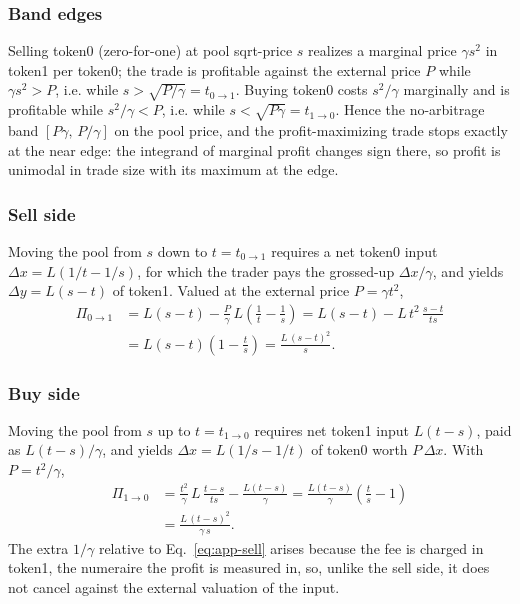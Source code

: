 \documentclass[a4paper,conference]{IEEEtran}
\begin{document}
\subsubsection{Band edges}
Selling token0 (zero-for-one) at pool sqrt-price $s$ realizes a marginal
price $\gamma s^{2}$ in token1 per token0; the trade is profitable
against the external price $P$ while $\gamma s^{2}>P$, i.e. while
$s>\sqrt{P/\gamma}=t_{0\to1}$. Buying token0 costs $s^{2}/\gamma$
marginally and is profitable while $s^{2}/\gamma<P$, i.e. while
$s<\sqrt{P\gamma}=t_{1\to0}$. Hence the no-arbitrage band
$[P\gamma,\,P/\gamma]$ on the pool price, and the profit-maximizing
trade stops exactly at the near edge: the integrand of marginal profit
changes sign there, so profit is unimodal in trade size with its
maximum at the edge.

\subsubsection{Sell side}
Moving the pool from $s$ down to $t=t_{0\to1}$ requires a net token0
input $\Delta x=L(1/t-1/s)$, for which the trader pays the grossed-up
$\Delta x/\gamma$, and yields $\Delta y=L(s-t)$ of token1. Valued at the
external price $P=\gamma t^{2}$,
\begin{align}
  \Pi_{0\to1}
  &= L(s-t)-\frac{P}{\gamma}\,L\!\left(\frac{1}{t}-\frac{1}{s}\right)
  = L(s-t)-L\,t^{2}\,\frac{s-t}{ts}\nonumber\\
  &= L(s-t)\!\left(1-\frac{t}{s}\right)
  = \frac{L\,(s-t)^{2}}{s}.
  \label{eq:app-sell}
\end{align}

\subsubsection{Buy side}
Moving the pool from $s$ up to $t=t_{1\to0}$ requires net token1 input
$L(t-s)$, paid as $L(t-s)/\gamma$, and yields
$\Delta x=L(1/s-1/t)$ of token0 worth $P\,\Delta x$. With
$P=t^{2}/\gamma$,
\begin{align}
  \Pi_{1\to0}
  &= \frac{t^{2}}{\gamma}\,L\,\frac{t-s}{ts}-\frac{L(t-s)}{\gamma}
  = \frac{L(t-s)}{\gamma}\!\left(\frac{t}{s}-1\right)\nonumber\\
  &= \frac{L\,(t-s)^{2}}{\gamma\,s}.
  \label{eq:app-buy}
\end{align}
The extra $1/\gamma$ relative to Eq.~\eqref{eq:app-sell} arises because
the fee is charged in token1, the numeraire the profit is measured in,
so, unlike the sell side, it does not cancel against the external
valuation of the input.
\end{document}
